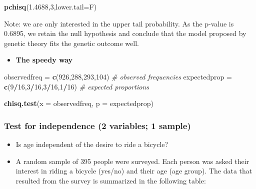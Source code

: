 \documentclass[]{article}
\newenvironment{Shaded}{\begin{snugshade}}{\end{snugshade}}
\newcommand{\CommentTok}[1]{\textcolor[rgb]{0.56,0.35,0.01}{\textit{#1}}}
\newcommand{\DataTypeTok}[1]{\textcolor[rgb]{0.13,0.29,0.53}{#1}}
\newcommand{\DecValTok}[1]{\textcolor[rgb]{0.00,0.00,0.81}{#1}}
\newcommand{\FloatTok}[1]{\textcolor[rgb]{0.00,0.00,0.81}{#1}}
\newcommand{\KeywordTok}[1]{\textcolor[rgb]{0.13,0.29,0.53}{\textbf{#1}}}
\newcommand{\NormalTok}[1]{#1}
\newcommand{\OperatorTok}[1]{\textcolor[rgb]{0.81,0.36,0.00}{\textbf{#1}}}
\newcommand{\StringTok}[1]{\textcolor[rgb]{0.31,0.60,0.02}{#1}}
\providecommand{\tightlist}{%
  \setlength{\itemsep}{0pt}\setlength{\parskip}{0pt}}
\begin{document}
\begin{Shaded}
\begin{Highlighting}[]
\KeywordTok{pchisq}\NormalTok{(}\FloatTok{1.4688}\NormalTok{,}\DecValTok{3}\NormalTok{,}\DataTypeTok{lower.tail=}\NormalTok{F)}
\end{Highlighting}
\end{Shaded}

Note: we are only interested in the upper tail probability. As the p-value is 0.6895, we retain the null hypothesis and conclude that the model proposed by genetic theory fits the genetic outcome well.

\begin{itemize}
\tightlist
\item
  \textbf{The speedy way}
\end{itemize}

\begin{Shaded}
\begin{Highlighting}[]
\NormalTok{observedfreq =}\StringTok{ }\KeywordTok{c}\NormalTok{(}\DecValTok{926}\NormalTok{,}\DecValTok{288}\NormalTok{,}\DecValTok{293}\NormalTok{,}\DecValTok{104}\NormalTok{)  }\CommentTok{# observed frequencies}
\NormalTok{expectedprop =}\StringTok{ }\KeywordTok{c}\NormalTok{(}\DecValTok{9}\OperatorTok{/}\DecValTok{16}\NormalTok{,}\DecValTok{3}\OperatorTok{/}\DecValTok{16}\NormalTok{,}\DecValTok{3}\OperatorTok{/}\DecValTok{16}\NormalTok{,}\DecValTok{1}\OperatorTok{/}\DecValTok{16}\NormalTok{)  }\CommentTok{# expected proportions}

\KeywordTok{chisq.test}\NormalTok{(}\DataTypeTok{x =}\NormalTok{ observedfreq,}
           \DataTypeTok{p =}\NormalTok{ expectedprop)}
\end{Highlighting}
\end{Shaded}

\hypertarget{test-for-independence-2-variables-1-sample}{%
\subsubsection{Test for independence (2 variables; 1 sample)}\label{test-for-independence-2-variables-1-sample}}

\begin{itemize}
\tightlist
\item
  Is age independent of the desire to ride a bicycle?
\item
  A random sample of 395 people were surveyed. Each person was asked their interest in riding a bicycle (yes/no) and their age (age group). The data that resulted from the survey is summarized in the following table:
\end{itemize}
\end{document}
